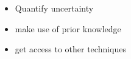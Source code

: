 \begin{itemize}
    \item Quantify uncertainty
    \item make use of prior knowledge
    \item get access to other techniques
\end{itemize}





